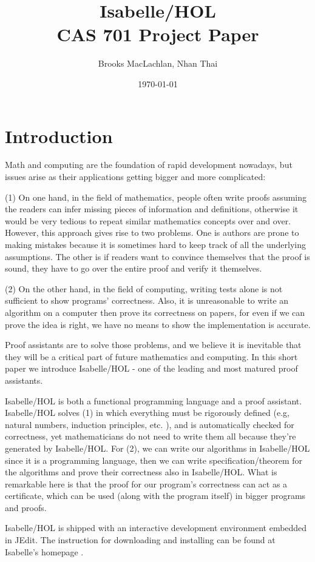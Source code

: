\documentclass{article}
\title{Isabelle/HOL \\ \large CAS 701 Project Paper}
\author{Brooks MacLachlan, Nhan Thai}
\date{\today}
\begin{document}
	
\maketitle

\newpage
\section{Introduction}
Math and computing are the foundation of rapid development nowadays, but issues arise as their applications getting bigger and
more complicated:

(1) On one hand, in the field of mathematics, people often write proofs assuming
the readers can infer missing pieces of information and definitions,
otherwise it would be very tedious to repeat similar mathematics concepts
over and over. However, this approach gives rise to two problems. One is
authors are prone to making mistakes because it is sometimes hard to
keep track of all the underlying assumptions. The other is if readers
want to convince themselves that the proof is sound, they have to go over the entire
proof and verify it themselves.

(2) On the other hand, in the field of computing, writing tests alone is not
sufficient to show programs' correctness.
Also, it is unreasonable to write an algorithm on a computer then prove its
correctness on papers, for even if we can prove the idea is right, we have
no means to show the implementation is accurate.


Proof assistants are to solve those problems,
and we believe it is inevitable that they will be a critical part of future mathematics and computing.
In this short paper we introduce Isabelle/HOL - one of the leading and most matured proof assistants.

Isabelle/HOL is both a functional programming language and a proof assistant.
Isabelle/HOL solves (1) in which everything must be rigorously defined (e.g, natural numbers, induction principles, etc. ),
and is automatically checked for correctness, yet mathematicians do not need to write them all
because they're generated by Isabelle/HOL. For (2), we can write our algorithms in Isabelle/HOL since
it is a programming language, then we can write specification/theorem for the algorithms and prove their
correctness also in Isabelle/HOL. What is remarkable here is that the proof for our program's correctness
can act as a certificate, which can be used (along with the program itself) in bigger programs and proofs.

Isabelle/HOL is shipped with an interactive development environment embedded in JEdit.
The instruction for downloading and installing can be found at Isabelle's homepage \cite{IsabelleWebsite}.
\end{document}
